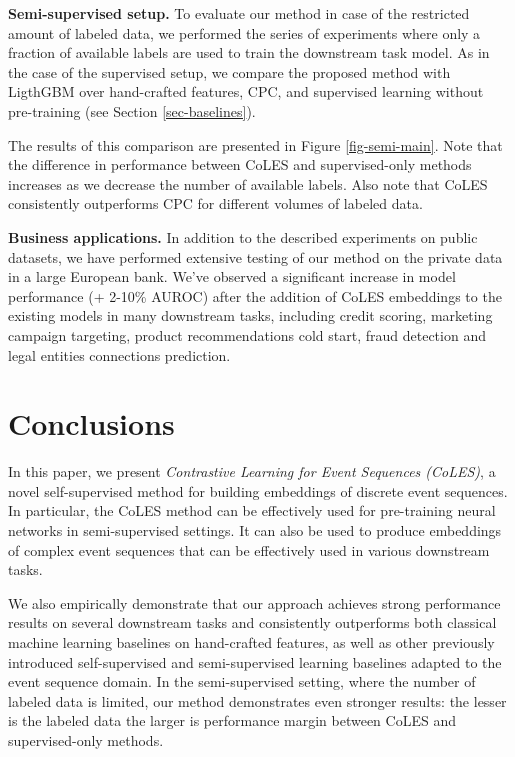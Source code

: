 \documentclass{article}
\begin{document}
\textbf{Semi-supervised setup.} To evaluate our method in case of the restricted amount of labeled data, we performed the series of experiments where only a fraction of available labels are used to train the downstream task model.
As in the case of the supervised setup, we compare the proposed method with LigthGBM over hand-crafted features, CPC, and supervised learning without pre-training (see Section \ref{sec-baselines}).

The results of this comparison are presented in Figure \ref{fig-semi-main}.
Note that the difference in performance between CoLES and supervised-only methods increases as we decrease the number of available labels. Also note that CoLES consistently outperforms CPC for different volumes of labeled data.

\textbf{Business applications.} In addition to the described experiments on public datasets, we have performed extensive testing of our method on the private data in a large European bank. We've observed a significant increase in model performance (+ 2-10\% AUROC) after the addition of CoLES embeddings to the existing models in many downstream tasks, including credit scoring, marketing campaign targeting, product recommendations cold start, fraud detection and legal entities connections prediction.


\section{Conclusions} \label{sec-conclusions}

In this paper, we present \emph{Contrastive Learning for Event Sequences (CoLES)}, a novel self-supervised method for building embeddings of discrete event sequences.
In particular, the CoLES method can be effectively used for pre-training neural networks in semi-supervised settings. It can also be used to produce embeddings of complex event sequences that can be effectively used in various downstream tasks.

We also empirically demonstrate that our approach achieves strong performance results on several downstream tasks and consistently outperforms both classical machine learning baselines on hand-crafted features, as well as other  previously introduced  self-supervised and semi-supervised learning baselines adapted to the event sequence domain.
In the semi-supervised setting, where the number of labeled data is limited, our method demonstrates even stronger results: the lesser is the labeled data the larger is performance margin between CoLES and supervised-only methods.
\end{document}
